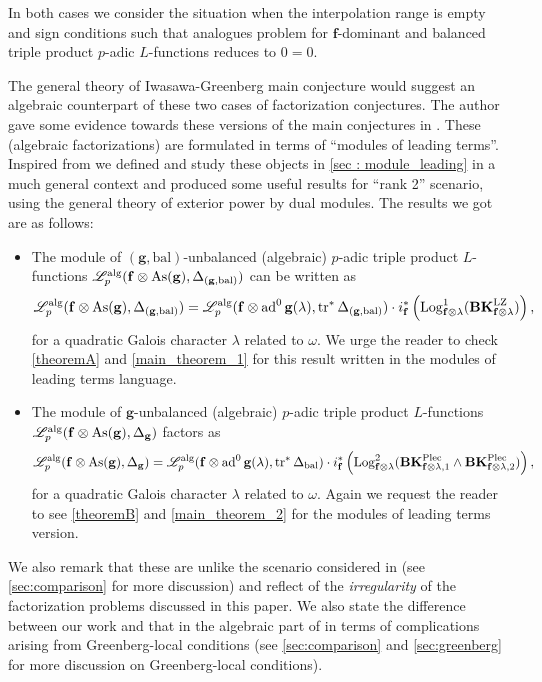 \documentclass[10pt]{amsart}
\numberwithin{equation}{section}
\theoremstyle{definition}
\theoremstyle{remark} %
\newcommand{\scr}{\mathscr}
\newcommand{\ad}{\operatorname{ad}}
\newcommand{\As}{\operatorname{As}}
\newcommand{\Log}{\operatorname{Log}}
\DeclareMathOperator{\tr}{{tr}^*}
\renewcommand{\b}{\mathrm{bal}}
\newcommand{\f}{\mathbf{f}}
\newcommand{\g}{\mathbf{g}}
\begin{document}
	In both cases we consider the situation when the interpolation range is empty and sign conditions such that analogues problem for $ \f $-dominant and balanced triple product $ p $-adic $ L $-functions reduces to $ 0=0 $.
	
	The general theory of Iwasawa-Greenberg main conjecture would suggest an algebraic counterpart of these two cases of factorization conjectures. The author gave some evidence towards these versions of the main conjectures in \cite{myself2}. These (algebraic factorizations) are formulated in terms of \enquote{modules of leading terms}. Inspired from \cite{BCS23} we defined and study these objects in \textsection \ref{sec : module_leading} in a much general context and produced some useful results for \enquote{rank 2} scenario, using the general theory of exterior power by dual modules. The results we got are as follows:
	\begin{itemize}
		\item[\textbf{(1,1)}] The module of $ (\g,\b)  $-unbalanced (algebraic) $ p $-adic triple product $ L $-functions $ \scr{L}_p^{\rm alg}(\f \otimes \As(\g), \Delta_{(\g, \b)} ) $ can be written as
		\begin{equation*}
			\scr{L}_p^{\rm alg}(\f \otimes \As(\g), \Delta_{(\g, \b)} )  = 	\scr{L}_p^{\rm alg}(\f \otimes \ad^0{\g}(\lambda), \tr \Delta_{(\g, \b)} )\cdot i^*_\f\left(\Log_{\f \otimes \lambda}^1(\mathbf{BK}_{\f\otimes \lambda}^{\rm LZ}) \right),
		\end{equation*} 
		for a quadratic Galois character $ \lambda $ related to $ \omega $. We urge the reader to check \cref{theoremA} and \cref{main_theorem_1} for this result written in the modules of leading terms language. 
		\item[\textbf{(0,2)}] The module of $ \g  $-unbalanced (algebraic) $ p $-adic triple product $ L $-functions $ \scr{L}_p^{\rm alg}(\f \otimes \As(\g), \Delta_{\g} ) $ factors as
		\[	\scr{L}_p^{\rm alg}(\f \otimes \As(\g), \Delta_{\g} )  = \scr{L}_p^{\rm alg}(\f \otimes \ad^0{\g}(\lambda), \tr \Delta_{\b} )\cdot i^*_\f\left(\Log^2_{\f \otimes \lambda}(\mathbf{BK}^{\rm Plec}_{\f\otimes \lambda,1} \wedge \mathbf{BK}^{\rm Plec}_{\f\otimes \lambda,2} )\right), \]
		for a quadratic Galois character $ \lambda $ related to $ \omega $. Again we request the reader to see \cref{theoremB} and \cref{main_theorem_2} for the modules of leading terms version.    
	\end{itemize}
	We also remark that these are unlike the scenario considered in \cite{Palva18} (see \textsection \ref{sec:comparison} for more discussion) and reflect of the \emph{irregularity} of the factorization problems discussed in this paper. We also state the difference between our work and that in the algebraic part of \cite{BCS23} in terms of complications arising from Greenberg-local conditions (see \textsection \ref{sec:comparison} and \textsection \ref{sec:greenberg} for more discussion on Greenberg-local conditions).   
\end{document}
